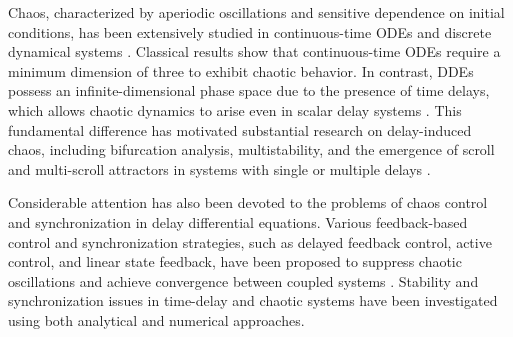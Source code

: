 \documentclass[11pt]{article}
\theoremstyle{remark}
\begin{document}
Chaos, characterized by aperiodic oscillations and sensitive dependence on initial conditions, has been extensively studied in continuous-time ODEs and discrete dynamical systems \cite{strogatz2001nonlinear}. Classical results show that continuous-time ODEs require a minimum dimension of three to exhibit chaotic behavior. In contrast, DDEs possess an infinite-dimensional phase space due to the presence of time delays, which allows chaotic dynamics to arise even in scalar delay systems \cite{mackey1977oscillation,farmer1982chaotic,bhalekar2012dynamical,berezowski2026influence}. This fundamental difference has motivated substantial research on delay-induced chaos, including bifurcation analysis, multistability, and the emergence of scroll and multi-scroll attractors in systems with single or multiple delays \cite{mackey1977oscillation,farmer1982chaotic,lu2006generating,lakshmanan2011dynamics,bhalekar2025analysis}.

Considerable attention has also been devoted to the problems of chaos control and synchronization in delay differential equations. Various feedback-based control and synchronization strategies, such as delayed feedback control, active control, and linear state feedback, have been proposed to suppress chaotic oscillations and achieve convergence between coupled systems \cite{pyragas1992continuous,babloyantz1995control,mensour1998chaos,niculescu2002delay,michiels2007stability,bhalekar2011new,bhalekar2010synchronization}. Stability and synchronization issues in time-delay and chaotic systems have been investigated using both analytical and numerical approaches\cite{mensour1998synchronization,pyragas1998synchronization,michiels2009synchronization}.
\end{document}
